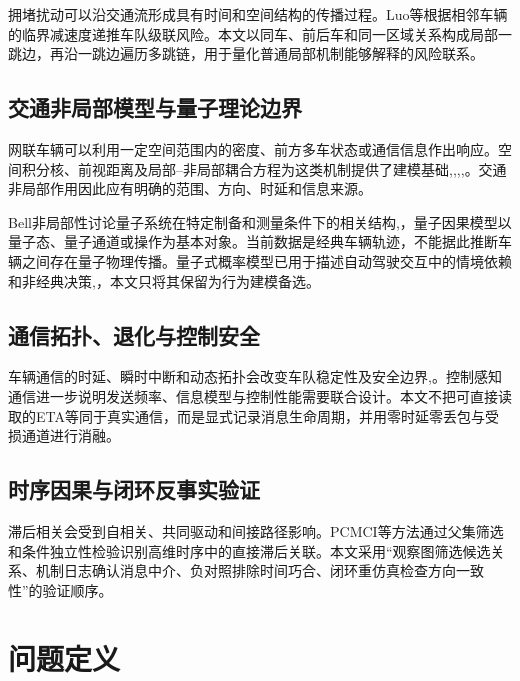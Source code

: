 \documentclass[journal]{IEEEtran}
\begin{document}
拥堵扰动可以沿交通流形成具有时间和空间结构的传播过程\cite{guan2025jam}。Luo等根据相邻车辆的临界减速度递推车队级联风险\cite{luo2026crm}。本文以同车、前后车和同一区域关系构成局部一跳边，再沿一跳边遍历多跳链，用于量化普通局部机制能够解释的风险联系。

\subsection{交通非局部模型与量子理论边界}

网联车辆可以利用一定空间范围内的密度、前方多车状态或通信信息作出响应。空间积分核、前视距离及局部--非局部耦合方程为这类机制提供了建模基础\cite{huang2022nonlocal},\cite{sun2020lookahead},\cite{colombo2026mixed},\cite{hui2025lookahead},\cite{friedrich2022network}。交通非局部作用因此应有明确的范围、方向、时延和信息来源。

Bell非局部性讨论量子系统在特定制备和测量条件下的相关结构\cite{bell1964},\cite{brunner2014}，量子因果模型以量子态、量子通道或操作为基本对象\cite{leifer2013}。当前数据是经典车辆轨迹，不能据此推断车辆之间存在量子物理传播。量子式概率模型已用于描述自动驾驶交互中的情境依赖和非经典决策\cite{song2022quantum},\cite{asano2017selection}，本文只将其保留为行为建模备选。

\subsection{通信拓扑、退化与控制安全}

车辆通信的时延、瞬时中断和动态拓扑会改变车队稳定性及安全边界\cite{hasan2023outage},\cite{wang2024topology}。控制感知通信进一步说明发送频率、信息模型与控制性能需要联合设计\cite{razzaghpour2023controlaware}。本文不把可直接读取的ETA等同于真实通信，而是显式记录消息生命周期，并用零时延零丢包与受损通道进行消融。

\subsection{时序因果与闭环反事实验证}

滞后相关会受到自相关、共同驱动和间接路径影响。PCMCI等方法通过父集筛选和条件独立性检验识别高维时序中的直接滞后关联\cite{runge2019pcmci}。本文采用“观察图筛选候选关系、机制日志确认消息中介、负对照排除时间巧合、闭环重仿真检查方向一致性”的验证顺序。

\section{问题定义}\label{sec:problem}
\end{document}
